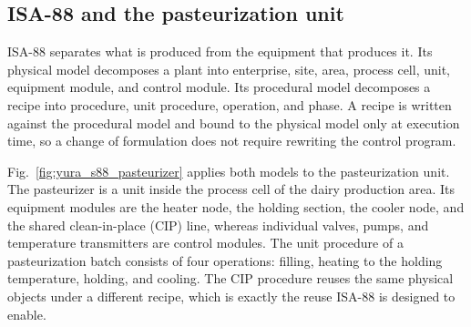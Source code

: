 \subsection{ISA-88 and the pasteurization unit}

ISA-88 \cite{ISA88} separates what is produced from the equipment that produces
it. Its physical model decomposes a plant into enterprise, site, area, process
cell, unit, equipment module, and control module. Its procedural model
decomposes a recipe into procedure, unit procedure, operation, and phase. A
recipe is written against the procedural model and bound to the physical model
only at execution time, so a change of formulation does not require rewriting
the control program.

Fig.~\ref{fig:yura_s88_pasteurizer} applies both models to the pasteurization
unit. The pasteurizer is a unit inside the process cell of the dairy production
area. Its equipment modules are the heater node, the holding section, the cooler
node, and the shared clean-in-place (CIP) line, whereas individual valves,
pumps, and temperature transmitters are control modules. The unit procedure of a
pasteurization batch consists of four operations: filling, heating to the
holding temperature, holding, and cooling. The CIP procedure reuses the same
physical objects under a different recipe, which is exactly the reuse ISA-88 is
designed to enable.

